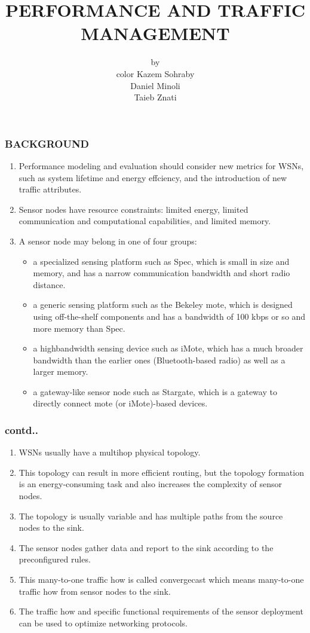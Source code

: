 \documentclass[11pt]{beamer}
\author [Beula]{\scriptsize by \\[1cm] color Kazem Sohraby \\Daniel Minoli \\Taieb Znati}
\title{PERFORMANCE AND TRAFFIC MANAGEMENT}
\begin{document}
	\maketitle
	
	\begin{frame}
		\frametitle{BACKGROUND}
			\begin{enumerate}
				\item   Performance modeling and evaluation should consider new metrics for WSNs, such as system lifetime and energy effciency, and the introduction of new traffic attributes.
				\item  Sensor nodes have resource constraints: limited energy, limited communication and computational capabilities, and limited memory. 
				\item  A sensor node may belong in one of four groups:
			\begin{itemize}
				\item a specialized sensing platform such as Spec, which is small in size and memory, and has a narrow communication bandwidth and short radio distance.
				\item a generic sensing platform such as the Bekeley mote, which is designed using off-the-shelf components and has a bandwidth of 100 kbps or so and more memory than Spec.
				\item a highbandwidth sensing device such as iMote, which has a much broader bandwidth than the earlier ones (Bluetooth-based radio) as well as a larger memory.
				\item a gateway-like sensor node such as Stargate, which is a gateway to directly connect mote (or iMote)-based devices.
				\end{itemize}
			
				
			\end{enumerate}
		
	\end{frame}
	\begin{frame}
		\frametitle{contd..}
		\begin{enumerate}
			\item WSNs usually have a multihop physical topology.
			\item This topology can result in more efficient routing, but the topology formation is an energy-consuming task and also increases the complexity of sensor nodes.
			\item The topology is usually variable and has multiple paths from the source nodes to the sink.
			\item The sensor nodes gather data and report to the sink according to the preconfigured rules. 
			\item This many-to-one traffic how is called convergecast which means many-to-one traffic how from sensor nodes to the sink.
			\item  The traffic how and specific functional requirements of the sensor deployment can be used to optimize networking protocols. 
		\end{enumerate}
		\end{frame}
\end{document}
